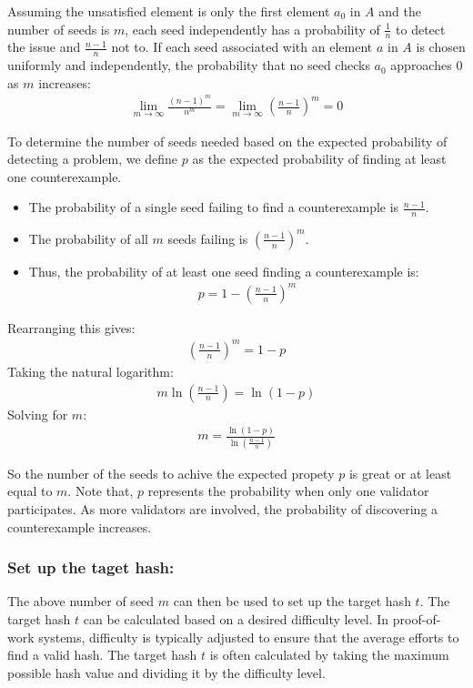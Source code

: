 \documentclass[runningheads]{llncs}
\begin{document}
Assuming the unsatisfied element is only the first element \( a_0 \) in \( A \) and the number of seeds is \( m \), each seed independently has a probability of \( \frac{1}{n} \) to detect the issue and \( \frac{n-1}{n} \) not to. If each seed associated with an element \( a \) in \( A \) is chosen uniformly and independently, the probability that no seed checks \( a_0 \) approaches 0 as \( m \) increases:
\begin{gather*}
\lim_{m \to \infty} \frac{(n-1)^m}{n^m} = \lim_{m \to \infty} \left( \frac{n-1}{n} \right)^m = 0
\end{gather*}

To determine the number of seeds needed based on the expected probability of detecting a problem, we define \( p \) as the expected probability of finding at least one counterexample. 
\begin{itemize}
    \item The probability of a single seed failing to find a counterexample is \( \frac{n-1}{n} \).
    \item The probability of all \( m \) seeds failing is \( \left( \frac{n-1}{n} \right)^m \).
    \item Thus, the probability of at least one seed finding a counterexample is:
\begin{gather*}
  p = 1 - \left( \frac{n-1}{n} \right)^m
\end{gather*}
\end{itemize}
Rearranging this gives:
\begin{gather*}
\left( \frac{n-1}{n} \right)^m = 1 - p
\end{gather*}
Taking the natural logarithm:
\begin{gather*}
m \ln\left( \frac{n-1}{n} \right) = \ln(1 - p)
\end{gather*}
Solving for \( m \):
\begin{gather}
\label{eq:12}
m = \frac{\ln(1 - p)}{\ln\left( \frac{n-1}{n} \right)}
\end{gather}

So the number of the seeds to achive the expected propety $p$ is great or at least equal to $m$. Note that, \( p \) represents the probability when only one validator participates. As more validators are involved, the probability of discovering a counterexample increases.
\subsubsection{Set up the taget hash:}
The above number of seed $m$ can then be used to set up the target hash $t$. The target hash $t$ can be calculated based on a desired difficulty level. In proof-of-work systems, difficulty is typically adjusted to ensure that the average efforts to find a valid hash. The target hash $t$ is often calculated by taking the maximum possible hash value and dividing it by the difficulty level.
\end{document}
